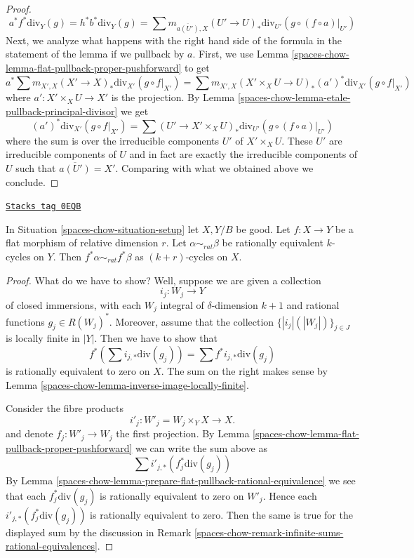 \begin{proof}
$$
a^*f^*\text{div}_Y(g) =
h^*b^*\text{div}_Y(g) =
\sum m_{\overline{a(U')}, X}
(U' \to U)_*\text{div}_{U'}(g \circ (f \circ a)|_{U'})
$$
Next, we analyze what happens with the right hand side of the
formula in the statement of the lemma if we pullback by $a$.
First, we use Lemma \ref{spaces-chow-lemma-flat-pullback-proper-pushforward}
to get
$$
a^*\sum m_{X', X} (X' \to X)_*\text{div}_{X'}(g \circ f|_{X'}) =
\sum m_{X', X} (X' \times_X U \to U)_*(a')^*\text{div}_{X'}(g \circ f|_{X'})
$$
where $a' : X' \times_X U \to X'$ is the projection.
By Lemma \ref{spaces-chow-lemma-etale-pullback-principal-divisor}
we get
$$
(a')^*\text{div}_{X'}(g \circ f|_{X'}) =
\sum (U' \to X' \times_X U)_*\text{div}_{U'}(g \circ (f \circ a)|_{U'})
$$
where the sum is over the irreducible components $U'$ of $X' \times_X U$.
These $U'$ are irreducible components of $U$ and in fact are exactly the
irreducible components of $U$ such that $\overline{a(U')} = X'$.
Comparing with what we obtained above we conclude.
\end{proof}

\begin{lemma}
\label{spaces-chow-lemma-flat-pullback-rational-equivalence}
\href{https://stacks.math.columbia.edu/tag/0EQB}{\texttt{Stacks tag 0EQB}}

In Situation \ref{spaces-chow-situation-setup} let $X, Y/B$ be good.
Let $f : X \to Y$ be a flat morphism of relative dimension $r$.
Let $\alpha \sim_{rat} \beta$ be rationally equivalent $k$-cycles
on $Y$. Then $f^*\alpha \sim_{rat} f^*\beta$ as $(k + r)$-cycles on $X$.
\end{lemma}

\begin{proof}
What do we have to show? Well, suppose we are given a collection
$$
i_j : W_j \longrightarrow Y
$$
of closed immersions, with each $W_j$ integral of $\delta$-dimension $k + 1$
and rational functions $g_j \in R(W_j)^*$. Moreover, assume that
the collection $\{|i_j|(|W_j|)\}_{j \in J}$ is locally finite in $|Y|$.
Then we have to show that
$$
f^*(\sum i_{j, *}\text{div}(g_j)) = \sum f^*i_{j, *}\text{div}(g_j)
$$
is rationally equivalent to zero on $X$. The sum on the right
makes sense by Lemma \ref{spaces-chow-lemma-inverse-image-locally-finite}.

\medskip\noindent
Consider the fibre products
$$
i'_j : W'_j = W_j \times_Y X \longrightarrow X.
$$
and denote $f_j : W'_j \to W_j$ the first projection.
By Lemma \ref{spaces-chow-lemma-flat-pullback-proper-pushforward}
we can write the sum above as
$$
\sum i'_{j, *}(f_j^*\text{div}(g_j))
$$
By Lemma \ref{spaces-chow-lemma-prepare-flat-pullback-rational-equivalence}
we see that each $f_j^*\text{div}(g_j)$ is rationally equivalent
to zero on $W'_j$. Hence each $i'_{j, *}(f_j^*\text{div}(g_j))$
is rationally equivalent to zero. Then the same is true for
the displayed sum by the discussion in
Remark \ref{spaces-chow-remark-infinite-sums-rational-equivalences}.
\end{proof}

